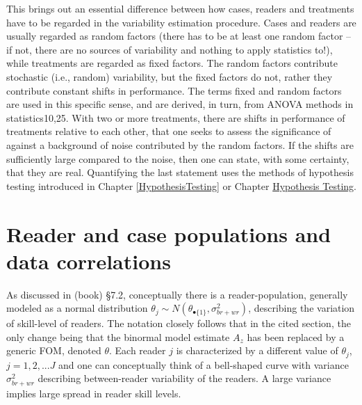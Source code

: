 \documentclass[
]{book}
\begin{document}
This brings out an essential difference between how cases, readers and treatments have to be regarded in the variability estimation procedure. Cases and readers are usually regarded as random factors (there has to be at least one random factor -- if not, there are no sources of variability and nothing to apply statistics to!), while treatments are regarded as fixed factors. The random factors contribute stochastic (i.e., random) variability, but the fixed factors do not, rather they contribute constant shifts in performance. The terms fixed and random factors are used in this specific sense, and are derived, in turn, from ANOVA methods in statistics10,25. With two or more treatments, there are shifts in performance of treatments relative to each other, that one seeks to assess the significance of against a background of noise contributed by the random factors. If the shifts are sufficiently large compared to the noise, then one can state, with some certainty, that they are real. Quantifying the last statement uses the methods of hypothesis testing introduced in Chapter \ref{HypothesisTesting} or Chapter \protect\hyperlink{HypothesisTesting}{Hypothesis Testing}.

\hypertarget{reader-and-case-populations-and-data-correlations}{%
\section{Reader and case populations and data correlations}\label{reader-and-case-populations-and-data-correlations}}

As discussed in (book) §7.2, conceptually there is a reader-population, generally modeled as a normal distribution \(\theta_j \sim N\left ( \theta_{\bullet\{1\}}, \sigma_{br+wr}^{2} \right )\), describing the variation of skill-level of readers. The notation closely follows that in the cited section, the only change being that the binormal model estimate \(A_z\) has been replaced by a generic FOM, denoted \(\theta\). Each reader \(j\) is characterized by a different value of \(\theta_j\), \(j=1,2,...J\) and one can conceptually think of a bell-shaped curve with variance \(\sigma_{br+wr}^{2}\) describing between-reader variability of the readers. A large variance implies large spread in reader skill levels.
\end{document}

